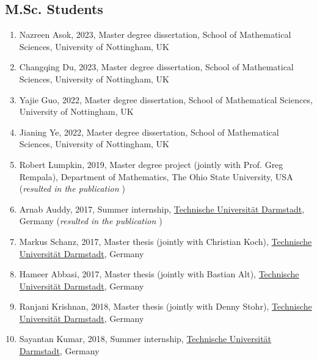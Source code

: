 \documentclass[11pt,a4paper,sans]{moderncv}        %
\begin{document}
\subsection{M.Sc. Students}
\begin{enumerate}
	\item Nazreen Asok, 2023, Master degree dissertation, School of Mathematical Sciences,  University of Nottingham, UK
	\item Changqing Du, 2023, Master degree dissertation, School of Mathematical Sciences,  University of Nottingham, UK
	\item Yajie Guo, 2022, Master degree dissertation, School of Mathematical Sciences,  University of Nottingham, UK
	\item Jianing Ye, 2022, Master degree dissertation, School of Mathematical Sciences,  University of Nottingham, UK
	\item Robert Lumpkin, 2019, Master degree project (jointly with Prof. Greg Rempala), Department of Mathematics, The Ohio State University, USA (\emph{resulted in the publication \cite{biomath2019}})
	\item Arnab Auddy, 2017, Summer internship, \href{http://www.tu-darmstadt.de/index.en.jsp}{Technische Universit\"{a}t Darmstadt}, Germany (\emph{resulted in the publication \cite{KhudaBukhsh2018Lumpability}})
	\item Markus Schanz, 2017, Master thesis (jointly with Christian Koch), \href{http://www.tu-darmstadt.de/index.en.jsp}{Technische Universit\"{a}t Darmstadt}, Germany
	\item Hameer Abbasi, 2017, Master thesis (jointly with Bastian Alt), \href{http://www.tu-darmstadt.de/index.en.jsp}{Technische Universit\"{a}t Darmstadt}, Germany
	\item Ranjani Krishnan, 2018, Master thesis (jointly with Denny Stohr), \href{http://www.tu-darmstadt.de/index.en.jsp}{Technische Universit\"{a}t Darmstadt}, Germany
	\item Sayantan Kumar, 2018, Summer internship, \href{http://www.tu-darmstadt.de/index.en.jsp}{Technische Universit\"{a}t Darmstadt}, Germany 
\end{enumerate}
\end{document}
